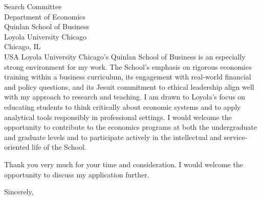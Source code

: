 \documentclass[11pt,letterpaper]{letter}
\begin{document}
\begin{letter}{Search Committee \\
Department of Economics \\
Quinlan School of Business \\
Loyola University Chicago \\
Chicago, IL \\ USA}
Loyola University Chicago’s Quinlan School of Business is an especially strong environment for my work. The School’s emphasis on rigorous economics training within a business curriculum, its engagement with real-world financial and policy questions, and its Jesuit commitment to ethical leadership align well with my approach to research and teaching. I am drawn to Loyola’s focus on educating students to think critically about economic systems and to apply analytical tools responsibly in professional settings. I would welcome the opportunity to contribute to the economics programs at both the undergraduate and graduate levels and to participate actively in the intellectual and service-oriented life of the School.

Thank you very much for your time and consideration. I would welcome the opportunity to discuss my application further.

\closing{Sincerely,}

\end{letter}
\end{document}
